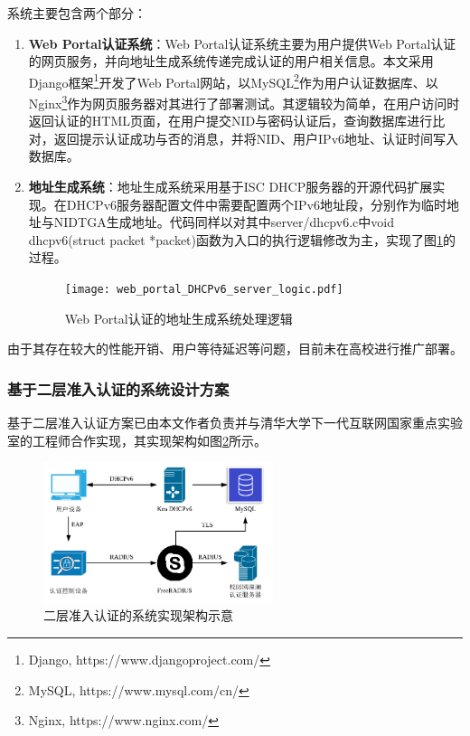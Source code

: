         系统主要包含两个部分：
        \begin{enumerate}[1{)}]
            \item \textbf{Web Portal认证系统}：Web Portal认证系统主要为用户提供Web Portal认证的网页服务，并向地址生成系统传递完成认证的用户相关信息。本文采用Django框架\footnote{Django, https://www.djangoproject.com/}开发了Web Portal网站，以MySQL\footnote{MySQL, https://www.mysql.com/cn/}作为用户认证数据库、以Nginx\footnote{Nginx, https://www.nginx.com/}作为网页服务器对其进行了部署测试。其逻辑较为简单，在用户访问时返回认证的HTML页面，在用户提交NID与密码认证后，查询数据库进行比对，返回提示认证成功与否的消息，并将NID、用户IPv6地址、认证时间写入数据库。
            \item \textbf{地址生成系统}：地址生成系统采用基于ISC DHCP服务器的开源代码扩展实现。在DHCPv6服务器配置文件中需要配置两个IPv6地址段，分别作为临时地址与NIDTGA生成地址。代码同样以对其中server/dhcpv6.c中void dhcpv6(struct packet *packet)函数为入口的执行逻辑修改为主，实现了图\ref{fig:web_portal_DHCPv6_server_logic}的过程。
            \begin{figure}[ht]
              \centering
              \texttt{[image: web\_portal\_DHCPv6\_server\_logic.pdf]}
              \caption{Web Portal认证的地址生成系统处理逻辑}
              \label{fig:web_portal_DHCPv6_server_logic}
            \end{figure}
        \end{enumerate}
    
        由于其存在较大的性能开销、用户等待延迟等问题，目前未在高校进行推广部署。

        \subsubsection{基于二层准入认证的系统设计方案}
        \label{NIDTGA:DHCPv6:implement:8021X}
        基于二层准入认证方案已由本文作者负责并与清华大学下一代互联网国家重点实验室的工程师合作实现，其实现架构如图\ref{fig:DHCPv6_8021X_implementation}所示。
        
        \begin{figure}[ht]
          \centering
          \includegraphics[width=0.6\textwidth]{figures/DHCPv6_8021X_implementation.png}
          \caption{二层准入认证的系统实现架构示意}
          \label{fig:DHCPv6_8021X_implementation}
        \end{figure}
        
